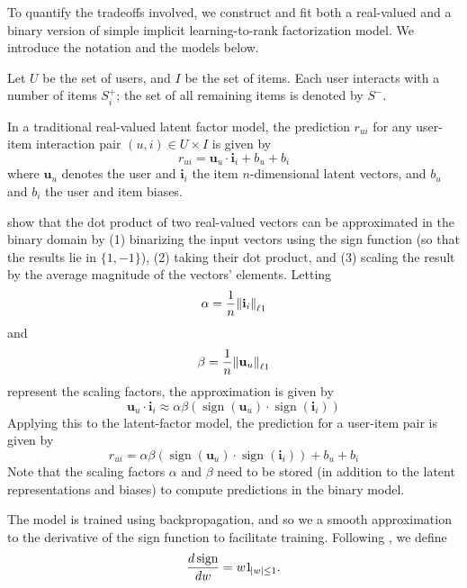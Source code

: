 \documentclass[sigchi]{acmart}
\newcommand\symUserSet{U}
\newcommand\symItemSet{I}
\newcommand\symUserInteractionSet{S}
\DeclareMathOperator{\sign}{sign}
\renewcommand\vec{\mathbf}
\begin{document}
To quantify the tradeoffs involved, we construct and fit both a real-valued and a binary version of simple implicit learning-to-rank factorization model. We introduce the notation and the models below.

Let $\symUserSet$ be the set of users, and $\symItemSet$ be the set of items. Each user interacts with a number of items $\symUserInteractionSet_i^+$; the set of all remaining items is denoted by $\symUserInteractionSet^-$.

In a traditional real-valued latent factor model, the prediction $r_{ui}$ for any user-item interaction pair $(u, i) \in \symUserSet \times \symItemSet$ is given by
\begin{equation}
r_{ui} = \vec{u}_u \cdot \vec{i}_i + b_u + b_i
\end{equation}
where $\vec{u}_u$ denotes the user and $\vec{i}_i$ the item $n$-dimensional latent vectors, and $b_u$ and $b_i$ the user and item biases.

\citet{rastegari2016xnor} show that the dot product of two real-valued vectors can be approximated in the binary domain by (1) binarizing the input vectors using the sign function (so that the results lie in $\{1, -1\}$), (2) taking their dot product, and (3) scaling the result by the average magnitude of the vectors' elements. Letting
\begin{equation}
\alpha = \frac{1}{n}\norm{\vec{i}_{i}}_{\ell1}
\end{equation}
and
\begin{equation}
\beta = \frac{1}{n}\norm{\vec{u}_{u}}_{\ell1}
\end{equation}
represent the scaling factors, the approximation is given by
\newcommand\binaryApproximation{ \alpha \beta\left(\sign(\vec{u}_u) \cdot \sign(\vec{i}_i)\right)}
\begin{equation}
\vec{u}_u \cdot \vec{i}_i \approx \binaryApproximation
\end{equation}
Applying this to the latent-factor model, the prediction for a user-item pair is given by
\begin{equation}
r_{ui} = \binaryApproximation + b_u + b_i
\end{equation}
Note that the scaling factors $\alpha$ and $\beta$ need to be stored (in addition to the latent representations and biases) to compute predictions in the binary model.

The model is trained using backpropagation, and so we a smooth approximation to the derivative of the sign function to facilitate training. Following \citet{courbariaux2016binarized}, we define
\begin{equation}
\frac{d\sign}{dw} = w1_{\abs{w} \leq 1}.
\end{equation}
\end{document}
